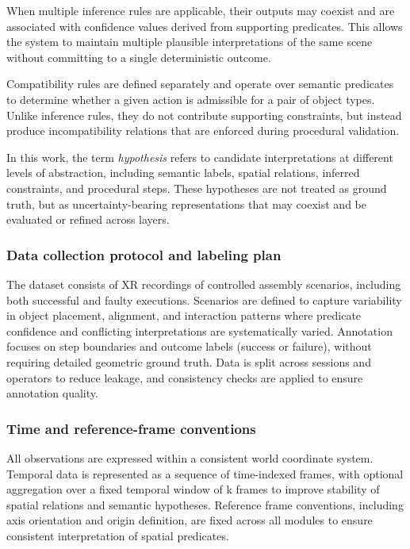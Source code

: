 \documentclass[11pt,titlepage,openright]{book}
\begin{document}
When multiple inference rules are applicable, their outputs may coexist and are associated with confidence values derived from supporting predicates. This allows the system to maintain multiple plausible interpretations of the same scene without committing to a single deterministic outcome.

Compatibility rules are defined separately and operate over semantic predicates to determine whether a given action is admissible for a pair of object types. Unlike inference rules, they do not contribute supporting constraints, but instead produce incompatibility relations that are enforced during procedural validation.

In this work, the term \textit{hypothesis} refers to candidate interpretations at different levels of abstraction, including semantic labels, spatial relations, inferred constraints, and procedural steps. These hypotheses are not treated as ground truth, but as uncertainty-bearing representations that may coexist and be evaluated or refined across layers.


\subsubsection{Data collection protocol and labeling plan}
\label{sec:data-protocol}
The dataset consists of XR recordings of controlled assembly scenarios, including both successful and faulty executions. Scenarios are defined to capture variability in object placement, alignment, and interaction patterns where predicate confidence and conflicting interpretations are systematically varied. Annotation focuses on step boundaries and outcome labels (success or failure), without requiring detailed geometric ground truth. Data is split across sessions and operators to reduce leakage, and consistency checks are applied to ensure annotation quality.

\subsubsection{Time and reference-frame conventions}
\label{sec:time-frames}
All observations are expressed within a consistent world coordinate system. Temporal data is represented as a sequence of time-indexed frames, with optional aggregation over a fixed temporal window of k frames to improve stability of spatial relations and semantic hypotheses. Reference frame conventions, including axis orientation and origin definition, are fixed across all modules to ensure consistent interpretation of spatial predicates.
\end{document}
